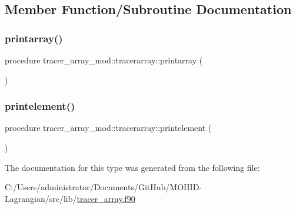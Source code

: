 \subsection{Member Function/\+Subroutine Documentation}
\mbox{\label{structtracer__array__mod_1_1tracerarray_a135a59d74ec030814a19278694d25d0a}} 
\subsubsection{\texorpdfstring{printarray()}{printarray()}}
{\footnotesize\ttfamily procedure tracer\+\_\+array\+\_\+mod\+::tracerarray\+::printarray (\begin{DoxyParamCaption}{ }\end{DoxyParamCaption})\hspace{0.3cm}{\ttfamily [private]}}

\mbox{\label{structtracer__array__mod_1_1tracerarray_a253185a06f76355710fcdd52d9a525f6}} 
\subsubsection{\texorpdfstring{printelement()}{printelement()}}
{\footnotesize\ttfamily procedure tracer\+\_\+array\+\_\+mod\+::tracerarray\+::printelement (\begin{DoxyParamCaption}{ }\end{DoxyParamCaption})\hspace{0.3cm}{\ttfamily [private]}}



The documentation for this type was generated from the following file\+:\begin{DoxyCompactItemize}
\item 
C\+:/\+Users/administrator/\+Documents/\+Git\+Hub/\+M\+O\+H\+I\+D-\/\+Lagrangian/src/lib/\hyperlink{tracer__array_8f90}{tracer\+\_\+array.\+f90}\end{DoxyCompactItemize}
